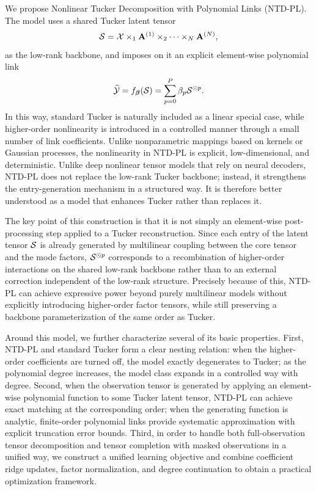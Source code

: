 We propose Nonlinear Tucker Decomposition with Polynomial Links (NTD-PL). The model uses a shared Tucker latent tensor
\[
\mathcal{S}=\mathcal{X}\times_1 \mathbf{A}^{(1)}\times_2\cdots\times_N \mathbf{A}^{(N)},
\]
as the low-rank backbone, and imposes on it an explicit element-wise polynomial link
\[
\widehat{\mathcal{Y}}=f_{\boldsymbol{\beta}}(\mathcal{S})=\sum_{p=0}^{P}\beta_p\mathcal{S}^{\odot p}.
\]
In this way, standard Tucker is naturally included as a linear special case, while higher-order nonlinearity is introduced in a controlled manner through a small number of link coefficients. Unlike nonparametric mappings based on kernels or Gaussian processes, the nonlinearity in NTD-PL is explicit, low-dimensional, and deterministic. Unlike deep nonlinear tensor models that rely on neural decoders, NTD-PL does not replace the low-rank Tucker backbone; instead, it strengthens the entry-generation mechanism in a structured way. It is therefore better understood as a model that enhances Tucker rather than replaces it.

The key point of this construction is that it is not simply an element-wise post-processing step applied to a Tucker reconstruction. Since each entry of the latent tensor $\mathcal{S}$ is already generated by multilinear coupling between the core tensor and the mode factors, $\mathcal{S}^{\odot p}$ corresponds to a recombination of higher-order interactions on the shared low-rank backbone rather than to an external correction independent of the low-rank structure. Precisely because of this, NTD-PL can achieve expressive power beyond purely multilinear models without explicitly introducing higher-order factor tensors, while still preserving a backbone parameterization of the same order as Tucker.

Around this model, we further characterize several of its basic properties. First, NTD-PL and standard Tucker form a clear nesting relation: when the higher-order coefficients are turned off, the model exactly degenerates to Tucker; as the polynomial degree increases, the model class expands in a controlled way with degree. Second, when the observation tensor is generated by applying an element-wise polynomial function to some Tucker latent tensor, NTD-PL can achieve exact matching at the corresponding order; when the generating function is analytic, finite-order polynomial links provide systematic approximation with explicit truncation error bounds. Third, in order to handle both full-observation tensor decomposition and tensor completion with masked observations in a unified way, we construct a unified learning objective and combine coefficient ridge updates, factor normalization, and degree continuation to obtain a practical optimization framework.

